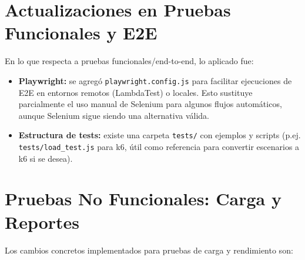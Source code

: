 \documentclass[12pt, a4paper]{article}
\begin{document}
\section{Actualizaciones en Pruebas Funcionales y E2E}

En lo que respecta a pruebas funcionales/end-to-end, lo aplicado fue:

\begin{itemize}
  \item \textbf{Playwright:} se agregó \texttt{playwright.config.js} para facilitar ejecuciones de E2E en entornos remotos (LambdaTest) o locales. Esto sustituye parcialmente el uso manual de Selenium para algunos flujos automáticos, aunque Selenium sigue siendo una alternativa válida.
  \item \textbf{Estructura de tests:} existe una carpeta \texttt{tests/} con ejemplos y scripts (p.ej. \texttt{tests/load_test.js} para k6, útil como referencia para convertir escenarios a k6 si se desea).
\end{itemize}

\section{Pruebas No Funcionales: Carga y Reportes}

Los cambios concretos implementados para pruebas de carga y rendimiento son:
\end{document}
